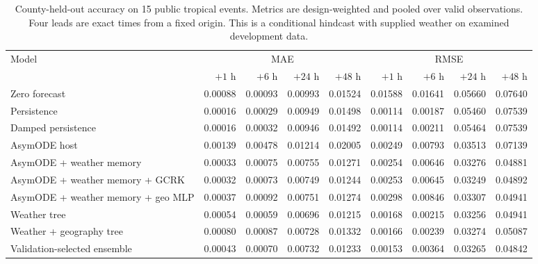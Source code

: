 \begin{table}[t]
\centering
\small
\caption{County-held-out accuracy on 15 public tropical events. Metrics are design-weighted and pooled over valid observations. Four leads are exact times from a fixed origin. This is a conditional hindcast with supplied weather on examined development data.}
\label{tab:public-tropical-t03}
\begin{tabular}{lrrrrrrrr}
\toprule
\multirow{2}{*}{Model} & \multicolumn{4}{c}{MAE} & \multicolumn{4}{c}{RMSE} \\
\cmidrule(lr){2-5}\cmidrule(lr){6-9}
 & $+1$ h & $+6$ h & $+24$ h & $+48$ h & $+1$ h & $+6$ h & $+24$ h & $+48$ h \\
\midrule
Zero forecast & 0.00088 & 0.00093 & 0.00993 & 0.01524 & 0.01588 & 0.01641 & 0.05660 & 0.07640 \\
Persistence & 0.00016 & 0.00029 & 0.00949 & 0.01498 & 0.00114 & 0.00187 & 0.05460 & 0.07539 \\
Damped persistence & 0.00016 & 0.00032 & 0.00946 & 0.01492 & 0.00114 & 0.00211 & 0.05464 & 0.07539 \\
AsymODE host & 0.00139 & 0.00478 & 0.01214 & 0.02005 & 0.00249 & 0.00793 & 0.03513 & 0.07139 \\
AsymODE + weather memory & 0.00033 & 0.00075 & 0.00755 & 0.01271 & 0.00254 & 0.00646 & 0.03276 & 0.04881 \\
AsymODE + weather memory + GCRK & 0.00032 & 0.00073 & 0.00749 & 0.01244 & 0.00253 & 0.00645 & 0.03249 & 0.04892 \\
AsymODE + weather memory + geo MLP & 0.00037 & 0.00092 & 0.00751 & 0.01274 & 0.00298 & 0.00846 & 0.03307 & 0.04941 \\
Weather tree & 0.00054 & 0.00059 & 0.00696 & 0.01215 & 0.00168 & 0.00215 & 0.03256 & 0.04941 \\
Weather + geography tree & 0.00080 & 0.00087 & 0.00728 & 0.01332 & 0.00166 & 0.00239 & 0.03274 & 0.05087 \\
Validation-selected ensemble & 0.00043 & 0.00070 & 0.00732 & 0.01233 & 0.00153 & 0.00364 & 0.03265 & 0.04842 \\
\bottomrule
\end{tabular}
\end{table}
